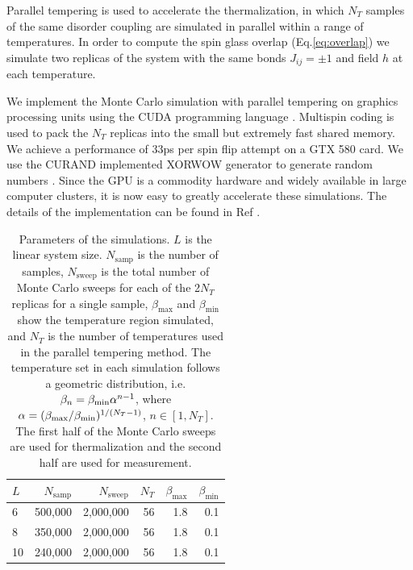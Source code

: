Parallel tempering\cite{Hukushima-Nemoto1996,Marinari-Parisi1992} is used to accelerate the thermalization, 
in which $N_T$ samples of the same disorder coupling are simulated in parallel within a range 
of temperatures. In order to compute 
the spin glass overlap (Eq.\ref{eq:overlap}) we simulate two replicas 
of the system with the same bonds $J_{ij}=\pm 1$ and field $h$ at each temperature. 

We implement the Monte Carlo simulation with parallel tempering on graphics 
processing units using the CUDA programming language \cite{Nickolls:2008:SPP:1365490.1365500}. 
Multispin coding\cite{PhysRevLett.42.1390,Zorn1981337} is used 
to pack the $N_T$ replicas into the small but extremely fast shared 
memory. We achieve a performance of 33ps per spin flip attempt on a GTX 580 card.
We use the CURAND implemented XORWOW generator to generate random numbers \cite{curand}.
Since the GPU is a commodity hardware and widely available in large
computer clusters, it is now easy to greatly accelerate these 
simulations. 
The details of the implementation can be found in 
Ref \cite{Fang-Feng-Tam-etal-2013}. 


\begin{table}[ht]
  \centering
  \caption{Parameters of the simulations.  $L$ is the linear system size.
$N_{\mathrm{samp}}$ is the number of samples, 
$N_{\mathrm{sweep}}$ is the total number of Monte Carlo sweeps for each of the 2$N_T$ replicas 
for a single sample, $\beta_{\mathrm{max}}$ and $\beta_{\mathrm{min}}$ show the temperature 
region simulated, and $N_T$ is the number of temperatures used in the parallel tempering method. 
The temperature set in each simulation follows a geometric distribution, 
i.e. $\beta_n=\beta_{\rm min}\alpha^{n-1}$, where $\alpha=(\beta_{\rm max}/\beta_{\rm min})^{1/(N_T-1)}$, $n\in [1,N_T]$.
The first half of the Monte Carlo sweeps are used for thermalization and the second half are used for measurement.}
 \begin{tabular}{lrrrrr}
    $L$&$N_{\mathrm{samp}}$&$N_{\mathrm{sweep}}$& $N_T$  &$\beta_{\mathrm{max}}$ &  $\beta_{\mathrm{min}}$  \\
\hline
6&500,000&2,000,000&56&1.8&0.1\\
8&350,000&2,000,000&56&1.8&0.1\\
10&240,000&2,000,000&56&1.8&0.1\\
  \end{tabular}
  \label{tab:parameters}
\end{table}

